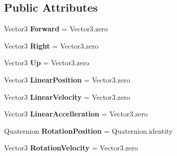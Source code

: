 \subsection*{Public Attributes}
\begin{DoxyCompactItemize}
\item 
\hypertarget{class_skyrates_1_1_physics_1_1_physics_data_abcd67d062642d7833662daf75a8215ca}{Vector3 {\bfseries Forward} = Vector3.\-zero}\label{class_skyrates_1_1_physics_1_1_physics_data_abcd67d062642d7833662daf75a8215ca}

\item 
\hypertarget{class_skyrates_1_1_physics_1_1_physics_data_a80bba7d110eb0e691251dfc35ab8a39c}{Vector3 {\bfseries Right} = Vector3.\-zero}\label{class_skyrates_1_1_physics_1_1_physics_data_a80bba7d110eb0e691251dfc35ab8a39c}

\item 
\hypertarget{class_skyrates_1_1_physics_1_1_physics_data_a4cab73286037ba9ddfaad4e632fdf3e5}{Vector3 {\bfseries Up} = Vector3.\-zero}\label{class_skyrates_1_1_physics_1_1_physics_data_a4cab73286037ba9ddfaad4e632fdf3e5}

\item 
\hypertarget{class_skyrates_1_1_physics_1_1_physics_data_a4ac44b7b282f757b3dda8a4aea682c4e}{Vector3 {\bfseries Linear\-Position} = Vector3.\-zero}\label{class_skyrates_1_1_physics_1_1_physics_data_a4ac44b7b282f757b3dda8a4aea682c4e}

\item 
\hypertarget{class_skyrates_1_1_physics_1_1_physics_data_a2c579124f3bb9f050b18d2fb51afbdd4}{Vector3 {\bfseries Linear\-Velocity} = Vector3.\-zero}\label{class_skyrates_1_1_physics_1_1_physics_data_a2c579124f3bb9f050b18d2fb51afbdd4}

\item 
\hypertarget{class_skyrates_1_1_physics_1_1_physics_data_aa5557848b1113086c6316d93473828d8}{Vector3 {\bfseries Linear\-Accelleration} = Vector3.\-zero}\label{class_skyrates_1_1_physics_1_1_physics_data_aa5557848b1113086c6316d93473828d8}

\item 
\hypertarget{class_skyrates_1_1_physics_1_1_physics_data_a78d6c49f82bb78b9e05acc88a0c83b7c}{Quaternion {\bfseries Rotation\-Position} = Quaternion.\-identity}\label{class_skyrates_1_1_physics_1_1_physics_data_a78d6c49f82bb78b9e05acc88a0c83b7c}

\item 
\hypertarget{class_skyrates_1_1_physics_1_1_physics_data_a3c5c3594c9f4b3de9cd054b0fd7a3fe6}{Vector3 {\bfseries Rotation\-Velocity} = Vector3.\-zero}\label{class_skyrates_1_1_physics_1_1_physics_data_a3c5c3594c9f4b3de9cd054b0fd7a3fe6}


\end{DoxyCompactItemize}
